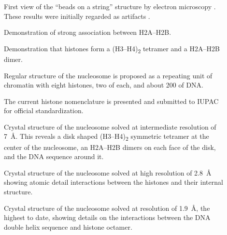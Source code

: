 {\begin{shaded}
\begin{description}
          \item[\cite{olins1974-nu-bodies}]
            First view of the ``beads on a string'' structure
            by electron microscopy .
            These results were initially
            regarded as artifacts \citep{pardon-wilkins-1972model}.

          \item[\cite{anna-isenberg-1974-h2a-h2b}]
            Demonstration of strong association between H2A--H2B.

          \item[\cite{kornberg1974-results}]
            Demonstration that histones form a (H3--H4)\textsubscript{2} tetramer
            and a H2A--H2B dimer.

          \item[\cite{kornberg1974-model}]
            Regular structure of the nucleosome is proposed as a repeating
            unit of chromatin with eight histones, two of each, and about
            \SI{200}{\bp} of DNA.

          \item[\cite{bradbury1975-histone-nomenclature}]
            The current histone nomenclature is presented
            and submitted to IUPAC for official standardization.

          \item[\cite{richmond1984-7angstrom}]
            Crystal structure of the nucleosome solved at intermediate
            resolution of \SI{7}{\angstrom}.
            This reveals a disk shaped (H3--H4)\textsubscript{2} symmetric
            tetramer at the center of the nucleosome, an H2A--H2B dimers
            on each face of the disk, and the DNA sequence around it.

          \item[\cite{luger1997-28angstrom}]
            Crystal structure of the nucleosome solved at high
            resolution of \SI{2.8}{\angstrom} showing atomic detail interactions
            between the histones and their internal structure.

          \item[\cite{richmond-1kx5-19ansgtrom}]
            Crystal structure of the nucleosome solved at resolution of
            \SI{1.9}{\angstrom}, the highest to date, showing details on
            the interactions between the DNA double helix sequence and
            histone octamer.
          \end{description}
        \end{shaded}
      }

